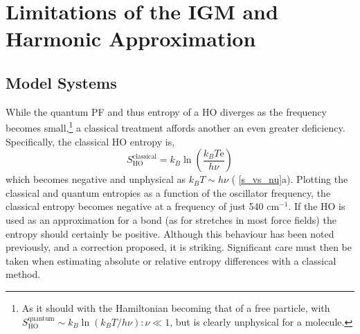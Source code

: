 \documentclass[../main.tex]{subfiles}
\begin{document}
\section{Limitations of the IGM and Harmonic Approximation}
\subsection{Model Systems}

While the quantum PF and thus entropy of a HO diverges as the frequency becomes small,\footnote{As it should with the Hamiltonian becoming that of a free particle, with $S_\text{HO}^\text{quantum} \sim k_B\ln(k_B T/h\nu) : \nu \ll 1$, but is clearly unphysical for a molecule.} a classical treatment affords another an even greater deficiency. Specifically, the classical HO entropy is,
\begin{equation}
S^\text{classical}_\text{HO} = k_B \ln\left(\frac{k_BT\text{e}}{h\nu}\right)
\end{equation}
which becomes negative and unphysical as $k_BT \sim h\nu$ (\figurename{ \ref{s_vs_nu}a}). Plotting the classical and quantum entropies as a function of the oscillator frequency, the classical entropy becomes negative at a frequency of just 540 cm$^{-1}$. If the HO is used as an approximation for a bond (as for stretches in most force fields) the entropy should certainly be positive. Although this behaviour has been noted previously, and a correction proposed,\cite{Schlitter1993} it is striking. Significant care must then be taken when estimating absolute or relative entropy differences with a classical method.
\end{document}
